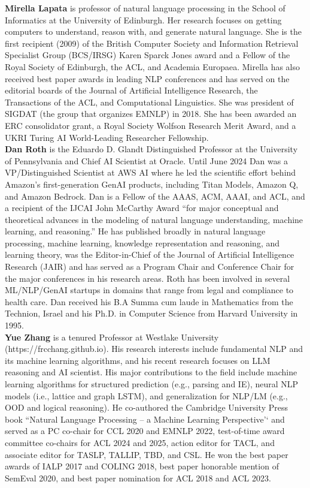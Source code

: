 \newpage

\textbf{Mirella Lapata} is professor of natural language processing in the School of Informatics at the University of Edinburgh. Her research focuses on getting computers to understand, reason with, and generate natural language. She is the first recipient (2009) of the British Computer Society and Information Retrieval Specialist Group (BCS/IRSG) Karen Sparck Jones award and a Fellow of the Royal Society of Edinburgh, the ACL, and Academia Europaea. Mirella has also received best paper awards in leading NLP conferences and has served on the editorial boards of the Journal of Artificial Intelligence Research, the Transactions of the ACL, and Computational Linguistics. She was president of SIGDAT (the group that organizes EMNLP) in 2018. She has been awarded an ERC consolidator grant, a Royal Society Wolfson Research Merit Award, and a UKRI Turing AI World-Leading Researcher Fellowship.\\

\textbf{Dan Roth} is the Eduardo D. Glandt Distinguished Professor at the University of Pennsylvania and Chief AI Scientist at Oracle. Until June 2024 Dan was a VP/Distinguished Scientist at AWS AI where he led the scientific effort behind Amazon’s first-generation GenAI products, including Titan Models, Amazon Q, and Amazon Bedrock.  Dan is a Fellow of the AAAS, ACM, AAAI, and ACL, and a recipient of the IJCAI John McCarthy Award “for major conceptual and theoretical advances in the modeling of natural language understanding, machine learning, and reasoning.” He has published broadly in natural language processing, machine learning, knowledge representation and reasoning, and learning theory, was the Editor-in-Chief of the Journal of Artificial Intelligence Research (JAIR) and has served as a Program Chair and Conference Chair for the major conferences in his research areas. Roth has been involved in several ML/NLP/GenAI startups in domains that range from legal and compliance to health care. Dan received his B.A Summa cum laude in Mathematics from the Technion, Israel and his Ph.D. in Computer Science from Harvard University in 1995.\\

\textbf{Yue Zhang} is a tenured Professor at Westlake University (https://frcchang.github.io). His research interests include fundamental NLP and its machine learning algorithms, and his recent research focuses on LLM reasoning and AI scientist. His major contributions to the field include machine learning algorithms for structured prediction (e.g., parsing and IE), neural NLP models (i.e., lattice and graph LSTM), and generalization for NLP/LM (e.g., OOD and logical reasoning). He co-authored the Cambridge University Press book ``Natural Language Processing -- a Machine Learning Perspective'‘ and served as a PC co-chair for CCL 2020 and EMNLP 2022, test-of-time award committee co-chairs for ACL 2024 and 2025, action editor for TACL, and associate editor for TASLP, TALLIP, TBD, and CSL. He won the best paper awards of IALP 2017 and COLING 2018, best paper honorable mention of SemEval 2020, and best paper nomination for ACL 2018 and ACL 2023.\\

